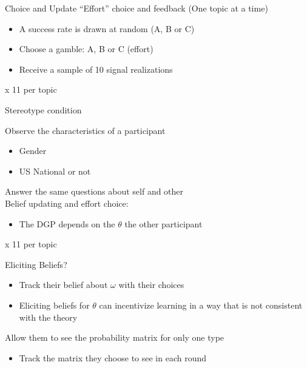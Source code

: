 \documentclass[aspectratio=169]{beamer}
\begin{document}
\begin{frame}{Choice and Update}
    ``Effort'' choice and feedback (One topic at a time)\\
    \bigskip
    \begin{itemize}
        \item A success rate is drawn at random (A, B or C)
        \item Choose a gamble: A, B or C (effort)
        \item Receive a sample of 10 signal realizations
    \end{itemize}
    \bigskip
    x 11 per topic

\end{frame}

\begin{frame}{Stereotype condition}

    Observe the characteristics of a participant \\
    \begin{itemize}
        \item Gender 
        \item US National or not \\
    \end{itemize}
    \bigskip
    Answer the same questions about self and other\\

    \bigskip
    Belief updating and effort choice:\\
    \begin{itemize}
        \item  The DGP depends on the $\theta$ the other participant
    \end{itemize}
    \bigskip
    x 11 per topic

\end{frame}

\begin{frame}{Eliciting Beliefs?}
    \begin{itemize}

        \item Track their belief about $\omega$ with their choices\\
        \bigskip
        \item Eliciting beliefs for $\theta$ can incentivize learning in a way that is not consistent with the theory\\
        \bigskip
        
    \end{itemize}

    Allow them to see the probability matrix for only one type 
    \begin{itemize}
        \item Track the matrix they choose to see in each round
    \end{itemize}

\end{frame}
\end{document}
